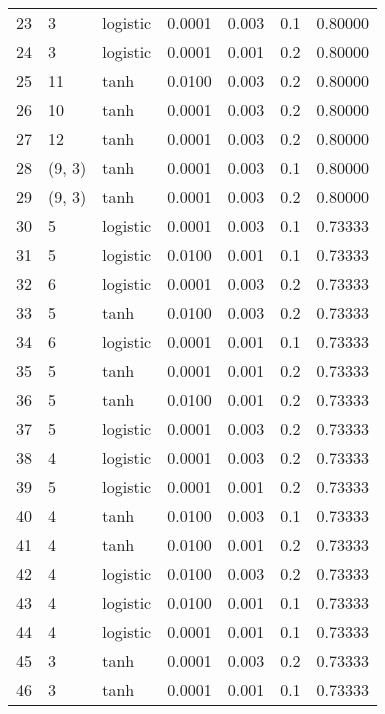 \begin{tabular}{lllrrrr}
23  &           3 &  logistic &  0.0001 &  0.003 &  0.1 &   0.80000 \\
24  &           3 &  logistic &  0.0001 &  0.001 &  0.2 &   0.80000 \\
25  &          11 &      tanh &  0.0100 &  0.003 &  0.2 &   0.80000 \\
26  &          10 &      tanh &  0.0001 &  0.003 &  0.2 &   0.80000 \\
27  &          12 &      tanh &  0.0001 &  0.003 &  0.2 &   0.80000 \\
28  &      (9, 3) &      tanh &  0.0001 &  0.003 &  0.1 &   0.80000 \\
29  &      (9, 3) &      tanh &  0.0001 &  0.003 &  0.2 &   0.80000 \\
30  &           5 &  logistic &  0.0001 &  0.003 &  0.1 &   0.73333 \\
31  &           5 &  logistic &  0.0100 &  0.001 &  0.1 &   0.73333 \\
32  &           6 &  logistic &  0.0001 &  0.003 &  0.2 &   0.73333 \\
33  &           5 &      tanh &  0.0100 &  0.003 &  0.2 &   0.73333 \\
34  &           6 &  logistic &  0.0001 &  0.001 &  0.1 &   0.73333 \\
35  &           5 &      tanh &  0.0001 &  0.001 &  0.2 &   0.73333 \\
36  &           5 &      tanh &  0.0100 &  0.001 &  0.2 &   0.73333 \\
37  &           5 &  logistic &  0.0001 &  0.003 &  0.2 &   0.73333 \\
38  &           4 &  logistic &  0.0001 &  0.003 &  0.2 &   0.73333 \\
39  &           5 &  logistic &  0.0001 &  0.001 &  0.2 &   0.73333 \\
40  &           4 &      tanh &  0.0100 &  0.003 &  0.1 &   0.73333 \\
41  &           4 &      tanh &  0.0100 &  0.001 &  0.2 &   0.73333 \\
42  &           4 &  logistic &  0.0100 &  0.003 &  0.2 &   0.73333 \\
43  &           4 &  logistic &  0.0100 &  0.001 &  0.1 &   0.73333 \\
44  &           4 &  logistic &  0.0001 &  0.001 &  0.1 &   0.73333 \\
45  &           3 &      tanh &  0.0001 &  0.003 &  0.2 &   0.73333 \\
46  &           3 &      tanh &  0.0001 &  0.001 &  0.1 &   0.73333 \\

\end{tabular}
